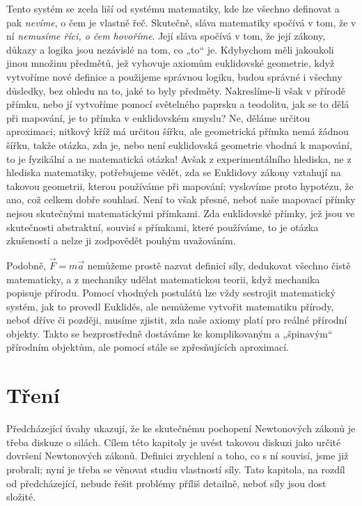 {    Tento systém se zcela liší od systému matematiky, kde lze všechno definovat a pak 
    \emph{nevíme}, o čem je vlastně řeč. Skutečně, sláva matematiky spočívá v tom, že v ní 
    \emph{nemusíme říci, o čem hovoříme}. Její sláva spočívá v tom, že její zákony, důkazy a logika 
    jsou nezávislé na tom, co „to“ je. Kdybychom měli jakoukoli jinou množinu předmětů, jež 
    vyhovuje axiomům euklidovské geometrie, když vytvoříme nové definice a použijeme správnou 
    logiku, budou správné i všechny důsledky, bez ohledu na to, jaké to byly předměty. 
    Nakreslíme-li však v přírodě přímku, nebo jí vytvoříme pomocí světelného paprsku a teodolitu, 
    jak se to dělá při mapování, je to přímka v euklidovském smyslu? Ne, děláme určitou aproximaci; 
    nitkový kříž má určitou šířku, ale geometrická přímka nemá žádnou šířku, takže otázka, zda je, 
    nebo není euklidovská geometrie vhodná k mapování, to je fyzikální a ne matematická otázka! 
    Avšak z experimentálního hlediska, ne z hlediska matematiky, potřebujeme vědět, zda se 
    Euklidovy zákony vztahují na takovou geometrii, kterou používáme při mapování; vyslovíme proto 
    hypotézu, že ano, což celkem dobře souhlasí. Není to však přesné, neboť naše mapovací přímky 
    nejsou skutečnými matematickými přímkami. Zda euklidovské přímky, jež jsou ve skutečnosti 
    abstraktní, souvisí s přímkami, které používáme, to je otázka zkušeností a nelze ji zodpovědět 
    pouhým uvažováním.
    
    Podobně, \(\vec{F}= m\vec{a}\) nemůžeme prostě nazvat definicí síly, dedukovat všechno čistě 
    matematicky, a z mechaniky udělat matematickou teorii, když mechanika popisuje přírodu. Pomocí 
    vhodných postulátů lze vždy sestrojit matematický systém, jak to provedl Euklidés, ale nemůžeme 
    vytvořit matematiku přírody, neboť dříve či později, musíme zjistit, zda naše axiomy platí pro 
    reálné přírodní objekty. Takto se bezprostředně dostáváme ke komplikovaným a „špinavým“ 
    přírodním objektům, ale pomocí stále se zpřesňujících aproximací.
    
  \section{Tření}\label{fyz:IchapXIIsecII}
    Předcházející úvahy ukazují, že ke skutečnému pochopení Newtonových zákonů je třeba diskuze o 
    silách. Cílem této kapitoly je uvést takovou diskuzi jako určité dovršení Newtonových zákonů. 
    Definici zrychlení a toho, co s ní souvisí, jsme již probrali; nyní je třeba se věnovat studiu 
    vlastností síly. Tato kapitola, na rozdíl od předcházející, nebude řešit problémy příliš 
    detailně, neboť síly jsou dost složité.
    
}

